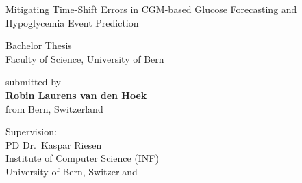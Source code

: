 \thispagestyle{empty}

\newcommand{\thesistitle}{Mitigating Time-Shift Errors in CGM-based Glucose Forecasting and Hypoglycemia Event Prediction}
\newcommand{\thesisauthor}{Robin Laurens van den Hoek}
\newcommand{\supervisor}{PD Dr.~Kaspar Riesen}

\vfill
\begin{titlepage}
\begin{center}
{\LARGE \thesistitle}\\[1.5em]
\vspace*{2.5cm}

\normalsize
Bachelor Thesis\\
Faculty of Science, University of Bern

\vfill\vfill\vfill

submitted by \\ \vspace*{0.2cm}
{\bf \thesisauthor} \\ \vspace*{0.2cm}
from Bern, Switzerland

\vfill\vfill\vfill\vfill\vfill\vfill\vfill

Supervision:\\[5pt]
\supervisor\\
Institute of Computer Science (INF)\\
University of Bern, Switzerland

\end{center}
\end{titlepage}
